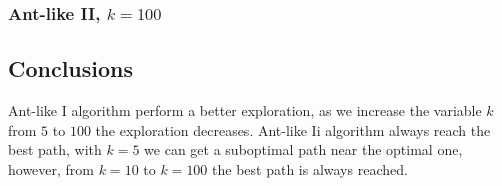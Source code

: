 \newpage
\subsubsection{Ant-like II, $k=100$}

\begin{figure}[ht]
\centering
{}
\label{fig:fig1}
\end{figure}



\newpage
\subsection{Conclusions}
Ant-like I algorithm perform a better exploration, as we increase the variable $k$ from $5$ to $100$ the exploration decreases. Ant-like Ii algorithm always reach the best path, with $k=5$ we can get a suboptimal path near the optimal one, however, from $k=10$ to $k=100$ the best path is always reached.